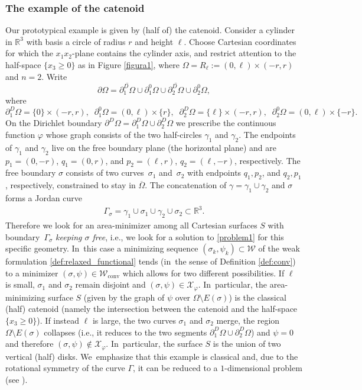 \documentclass[11pt]{article}
\newcommand{\ie}{i.e.,\xspace}
\numberwithin{equation}{section}
\newcommand{\R}{\mathbb{R}}
\let\Om\Omega
\newcommand\admclassconv{{\mathcal W_\mathrm{conv}}}
\theoremstyle{definition}
\begin{document}
\subsubsection*{The example of the catenoid}
Our prototypical example is given by (half of) the catenoid.
Consider a cylinder in $\R^3$ with basis a circle of radius $r$
and height $\ell$.
Choose Cartesian coordinates for which the $x_1x_2$-plane
contains the cylinder axis, and restrict attention to the half-space
$\{x_3\geq0\}$ as
in Figure \ref{figura1},
where $\Omega=R_\ell := (0,\ell)\times(-r,r)$ and $n=2$.
Write
\[
\partial \Omega=\overline{\partial^D_1\Om}\cup\partial^0_1\Omega\cup \overline{\partial^D_2\Om}\cup \partial^0_2\Omega,
\]
where
\[
\partial^D_1\Om=\{0\}\times(-r,r),\;\; \partial^0_1\Omega=(0,\ell)\times\{r\},\;\; \partial^D_2\Om=\{\ell\}\times(-r,r),\;\; \partial^0_2\Omega=(0,\ell)\times\{-r\}.
\]
On the Dirichlet boundary $\partial^D\Om=\partial^D_1\Om\cup\partial^D_2\Om$ we prescribe the continuous function $\varphi$ whose graph
consists of the two half-circles $\gamma_1$ and $\gamma_2$. The endpoints of $\gamma_1$ and $\gamma_2$ live on the
free boundary plane (the horizontal plane) and are $p_1=(0,-r)$, $q_1=(0,r)$, and $p_2=(\ell,r)$, $q_2=(\ell,-r)$, respectively. The free boundary
$\sigma$ consists of two curves~$\sigma_1$ and~$\sigma_2$
with endpoints $q_1,p_2$, and $q_2,p_1$, respectively,
constrained to stay in $\overline\Omega$. The concatenation of $\gamma=\gamma_1\cup\gamma_2$ and $\sigma$
forms a Jordan curve
\begin{align}\label{gammasigma}
\Gamma_\sigma=\gamma_1\cup\sigma_1\cup\gamma_2\cup\sigma_2 \subset
\R^3.
\end{align}
Therefore we look for an area-minimizer
among all Cartesian surfaces $S$ with boundary~$\Gamma_\sigma$
{\it keeping $\sigma$ free}, \ie we look for a solution to \eqref{problem1} for this specific geometry. In~this case a minimizing sequence $(\sigma_k,\psi_k)\subset\mathcal W$ of the weak formulation \eqref{def:relaxed_functional} tends (in~the sense of Definition \ref{def:conv}) to a minimizer $(\sigma,\psi)\in \admclassconv$ which allows for two different possibilities. If $\ell$ is small, $\sigma_1$ and $\sigma_2$ remain disjoint and $(\sigma,\psi)\in\mathcal X_\varphi$. In~particular, the area-minimizing surface $S$ (given by the graph of $\psi$ over $\Om\setminus E(\sigma)$) is the classical (half) catenoid (namely the intersection between the catenoid and the half-space $\{x_3\geq0\}$). If instead $\ell$ is large, the two curves $\sigma_1$ and $\sigma_2$ merge, the region $\Om\setminus E(\sigma)$ collapses (\ie it reduces to the two segments $\partial_1^D\Omega\cup\partial_2^D\Omega$) and $\psi=0$ and therefore $(\sigma,\psi)\notin\mathcal X_\varphi$. In~particular, the surface $S$ is
the union of two vertical (half) disks. We~emphasize that this example is classical and, due
to the rotational symmetry of the curve $\Gamma$, it can be
reduced to a $1$-dimensional problem (see \cite{Greco,Bevi}).
\end{document}
